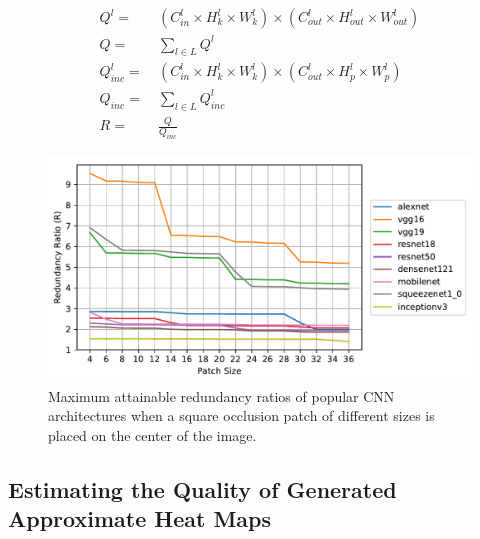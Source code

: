 \begin{align}
\label{eqn:full_local}
Q^l =&~ (C^l_{in} \times H^l_{k} \times W^l_{k}) \times (C^l_{out} \times H^l_{out} \times W^l_{out})\\
\label{eqn:full_all}
Q =&~ \sum_{l \in L} Q^l\\
\label{eqn:inc_local}
Q_{inc}^l =&~ (C^l_{in} \times H^l_{k} \times W^l_{k}) \times (C^l_{out} \times H^l_{p} \times W^l_{p})\\
\label{eqn:inc_all}
Q_{inc} =&~ \sum_{l \in L} Q^l_{inc}\\
\label{eqn:redundancy_ratio}
R =&~ \frac{Q}{Q_{inc}}
\end{align}

\begin{figure}[t]
\includegraphics[width=\columnwidth]{images/redundancy_ratio}
\caption{Maximum attainable redundancy ratios of popular CNN architectures when a square occlusion patch of different sizes is placed on the center of the image.}
\label{fig:redundancy_ratio}
\end{figure}


\subsection{Estimating the Quality of Generated Approximate Heat Maps}

